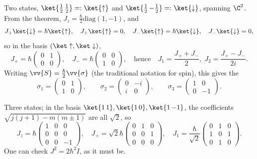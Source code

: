 \begin{example}[$j = \tfrac12$]
    Two states, $\ket{\tfrac12\,\tfrac12} =: \ket{\uparrow}$ and $\ket{\tfrac12\,{-\tfrac12}} =: \ket{\downarrow}$, spanning $\C^2$. From the theorem, $J_z = \frac{\hbar}{2}\mathrm{diag}(1,-1)$, and
    $$
    J_+\ket{\downarrow} = \hbar\ket{\uparrow}, \quad J_+\ket{\uparrow} = 0, \quad J_-\ket{\uparrow} = \hbar\ket{\downarrow}, \quad J_-\ket{\downarrow} = 0,
    $$
    so in the basis $(\ket\uparrow, \ket\downarrow)$,
    $$
    J_+ = \hbar\begin{pmatrix}0&1\\0&0\end{pmatrix}, \quad J_- = \hbar\begin{pmatrix}0&0\\1&0\end{pmatrix}, \quad \text{hence} \quad J_1 = \frac{J_++J_-}{2}, \; J_2 = \frac{J_+-J_-}{2i}.
    $$
    Writing $\vv{S} = \frac{\hbar}{2}\vv{\sigma}$ (the traditional notation for spin), this gives the 
    $$
    \sigma_1 = \begin{pmatrix}0&1\\1&0\end{pmatrix}, \qquad
    \sigma_2 = \begin{pmatrix}0&-i\\i&0\end{pmatrix}, \qquad
    \sigma_3 = \begin{pmatrix}1&0\\0&-1\end{pmatrix}.
    $$
\end{example}

\begin{example}[$j = 1$]
    Three states; in the basis $\ket{1\,1}, \ket{1\,0}, \ket{1\,{-1}}$, the coefficients $\sqrt{j(j+1)-m(m\pm1)}$ are all $\sqrt2$, so
    $$
    J_z = \hbar\begin{pmatrix}1&0&0\\0&0&0\\0&0&-1\end{pmatrix}, \quad
    J_+ = \sqrt2 \hbar\begin{pmatrix}0&1&0\\0&0&1\\0&0&0\end{pmatrix}, \quad
    J_1 = \frac{\hbar}{\sqrt2}\begin{pmatrix}0&1&0\\1&0&1\\0&1&0\end{pmatrix}.
    $$
    One can check $J^2 = 2\hbar^2 I$, as it must be.
\end{example}

